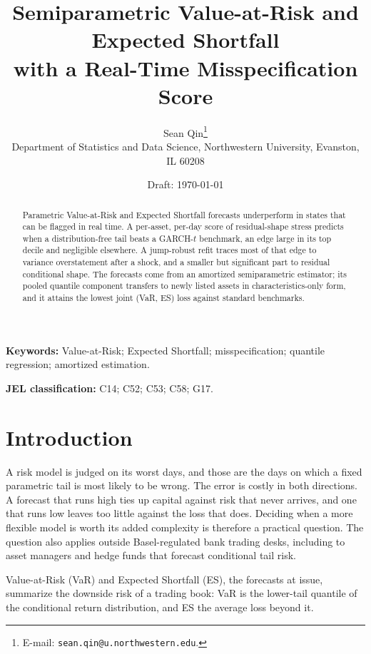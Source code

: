 \documentclass[11pt]{article}
\title{Semiparametric Value-at-Risk and Expected Shortfall\\
with a Real-Time Misspecification Score}
\author{%
  Sean Qin\thanks{E-mail: \texttt{sean.qin@u.northwestern.edu}.}\\[4pt]
  \normalsize Department of Statistics and Data Science, Northwestern
  University, Evanston, IL 60208}
\date{Draft: \today}
\theoremstyle{remark}
\begin{document}
\maketitle
\let\footnote\endnote

\begin{abstract}
Parametric Value-at-Risk and Expected Shortfall forecasts underperform in states that can be flagged in real time. A per-asset, per-day score of
residual-shape stress predicts when a distribution-free tail beats a
GARCH-$t$ benchmark, an edge large in its top decile and negligible
elsewhere. A jump-robust refit traces most of that edge to variance
overstatement after a shock, and a smaller but significant part to residual
conditional shape. The forecasts come from an amortized semiparametric estimator; its pooled quantile component transfers to newly listed assets in characteristics-only form, and it attains the lowest joint (VaR, ES) loss against standard benchmarks.
\end{abstract}

\noindent\textbf{Keywords:} Value-at-Risk; Expected Shortfall;
misspecification; quantile regression; amortized estimation.

\medskip
\noindent\textbf{JEL classification:} C14; C52; C53; C58; G17.

\section*{Introduction}\label{sec:intro}

A risk model is judged on its worst days, and those are the days on which
a fixed parametric tail is most likely to be wrong. The error is costly in
both directions. A forecast that runs high ties up capital against risk
that never arrives, and one that runs low leaves too little against the
loss that does. Deciding when a more flexible model is worth its added
complexity is therefore a practical question. The question also applies outside Basel-regulated bank trading desks, including to asset managers and hedge funds that forecast conditional tail risk.

Value-at-Risk (VaR) and Expected Shortfall
(ES), the forecasts at issue, summarize the downside risk of a trading
book: VaR is the lower-tail quantile of the conditional return distribution, and
ES the average loss beyond it.
\end{document}
